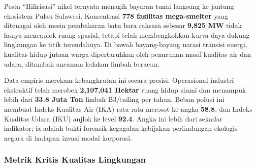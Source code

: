 \documentclass[
]{article}
\begin{document}
Pesta ``Hilirisasi'' nikel ternyata menagih bayaran tunai langsung ke
jantung ekosistem Pulau Sulawesi. Konsentrasi \textbf{778 fasilitas
mega-smelter} yang ditenagai oleh mesin pembakaran batu bara raksasa
sebesar \textbf{9,825 MW} tidak hanya mencaplok ruang spasial, tetapi
telah membengkokkan kurva daya dukung lingkungan ke titik terendahnya.
Di bawah bayang-bayang narasi transisi energi, kualitas hidup jutaan
warga dipertaruhkan oleh penurunan masif kualitas air dan udara,
ditambah ancaman ledakan limbah beracun.

Data empiris merekam kebangkrutan ini secara presisi. Operasional
industri ekstraktif telah merobek \textbf{2,107,041 Hektar} ruang hidup
alami dan menumpuk lebih dari \textbf{33.8 Juta Ton} limbah B3/tailing
per tahun. Beban polusi ini membuat Indeks Kualitas Air (IKA) rata-rata
merosot ke angka \textbf{58.8}, dan Indeks Kualitas Udara (IKU) anjlok
ke level \textbf{92.4}. Angka ini lebih dari sekadar indikator; ia
adalah bukti forensik kegagalan kebijakan perlindungan ekologis negara
di hadapan invasi modal korporasi.

\subsubsection{Metrik Kritis Kualitas
Lingkungan}\label{metrik-kritis-kualitas-lingkungan}
\end{document}
